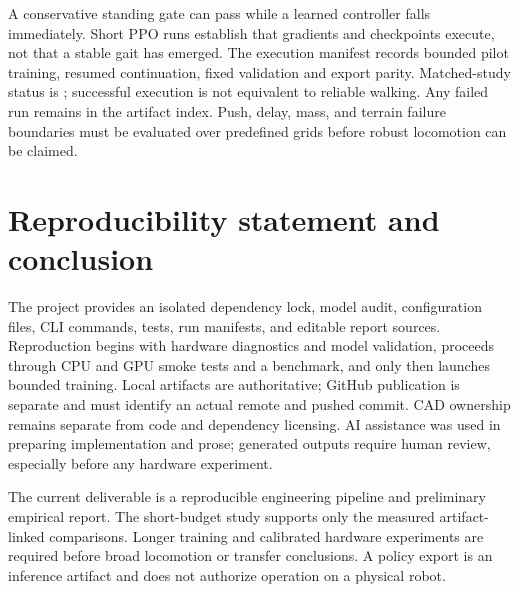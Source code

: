 \documentclass[11pt]{article}
\begin{document}
A conservative standing gate can pass while a learned controller falls immediately. Short PPO runs establish that gradients and checkpoints execute, not that a stable gait has emerged. The execution manifest records bounded pilot training, resumed continuation, fixed validation and export parity. Matched-study status is \StudyStatus; successful execution is not equivalent to reliable walking. Any failed run remains in the artifact index. Push, delay, mass, and terrain failure boundaries must be evaluated over predefined grids before robust locomotion can be claimed.

\section{Reproducibility statement and conclusion}
The project provides an isolated dependency lock, model audit, configuration files, CLI commands, tests, run manifests, and editable report sources. Reproduction begins with hardware diagnostics and model validation, proceeds through CPU and GPU smoke tests and a benchmark, and only then launches bounded training. Local artifacts are authoritative; GitHub publication is separate and must identify an actual remote and pushed commit. CAD ownership remains separate from code and dependency licensing. AI assistance was used in preparing implementation and prose; generated outputs require human review, especially before any hardware experiment.

The current deliverable is a reproducible engineering pipeline and preliminary empirical report. The short-budget study supports only the measured artifact-linked comparisons. Longer training and calibrated hardware experiments are required before broad locomotion or transfer conclusions. A policy export is an inference artifact and does not authorize operation on a physical robot.

\end{document}
